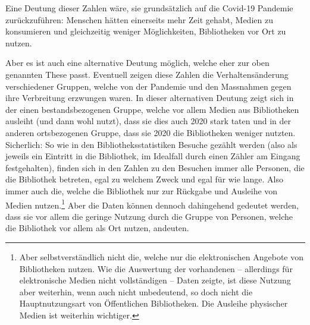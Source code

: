 \documentclass[a4paper,
fontsize=11pt,
oneside,
numbers=noperiodatend,
parskip=half-,
bibliography=totoc,
final
]{scrartcl}
\begin{document}
Eine Deutung dieser Zahlen wäre, sie grundsätzlich auf die Covid-19
Pandemie zurückzuführen: Menschen hätten einerseits mehr Zeit gehabt,
Medien zu konsumieren und gleichzeitig weniger Möglichkeiten,
Bibliotheken vor Ort zu nutzen.

Aber es ist auch eine alternative Deutung möglich, welche eher zur oben
genannten These passt. Eventuell zeigen diese Zahlen die
Verhaltensänderung verschiedener Gruppen, welche von der Pandemie und
den Massnahmen gegen ihre Verbreitung erzwungen waren. In dieser
alternativen Deutung zeigt sich in der einen bestandsbezogenen Gruppe,
welche vor allem Medien aus Bibliotheken ausleiht (und dann wohl nutzt),
dass sie dies auch 2020 stark taten und in der anderen ortsbezogenen
Gruppe, dass sie 2020 die Bibliotheken weniger nutzten. Sicherlich: So
wie in den Bibliotheksstatistiken Besuche gezählt werden (also als
jeweils ein Eintritt in die Bibliothek, im Idealfall durch einen Zähler
am Eingang festgehalten), finden sich in den Zahlen zu den Besuchen
immer alle Personen, die die Bibliothek betreten, egal zu welchem Zweck
und egal für wie lange. Also immer auch die, welche die Bibliothek nur
zur Rückgabe und Ausleihe von Medien nutzen.\footnote{Aber
  selbstverständlich nicht die, welche nur die elektronischen Angebote
  von Bibliotheken nutzen. Wie die Auswertung der vorhandenen --
  allerdings für elektronische Medien nicht vollständigen -- Daten
  zeigte, ist diese Nutzung aber weiterhin, wenn auch nicht unbedeutend,
  so doch nicht die Hauptnutzungsart von Öffentlichen Bibliotheken. Die
  Ausleihe physischer Medien ist weiterhin wichtiger.} Aber die Daten
können dennoch dahingehend gedeutet werden, dass sie vor allem die
geringe Nutzung durch die Gruppe von Personen, welche die Bibliothek vor
allem als Ort nutzen, andeuten.
\end{document}

